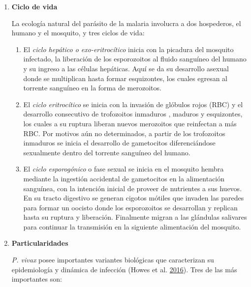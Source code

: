 \documentclass[
  a4paper]{article}
\providecommand{\tightlist}{%
  \setlength{\itemsep}{0pt}\setlength{\parskip}{0pt}}
\begin{document}
\begin{enumerate}
  \begin{enumerate}
  \def\labelenumii{\roman{enumii}.}
  \item
    \textbf{Ciclo de vida}

    La ecología natural del parásito de la malaria involucra a dos
    hospederos, el humano y el mosquito, y tres ciclos de vida:

    \begin{enumerate}
    \def\labelenumiii{\arabic{enumiii}.}
    \tightlist
    \item
      El \emph{ciclo hepático o exo-eritrocítico} inicia con la picadura
      del mosquito infectado, la liberación de los esporozoitos al
      fluido sanguíneo del humano y su ingreso a las células hepáticas.
      Aquí se da su desarrollo asexual donde se multiplican hasta formar
      esquizontes, los cuales egresan al torrente sanguíneo en la forma
      de merozoitos.
    \item
      El \emph{ciclo eritrocítico} se inicia con la invasión de glóbulos
      rojos (RBC) y el desarrollo consecutivo de trofozoitos inmaduros ,
      maduros y esquizontes, los cuales a su ruptura liberan nuevos
      merozoitos que reinfectan a más RBC. Por motivos aún no
      determinados, a partir de los trofozoitos inmaduros se inicia el
      desarrollo de gametocitos diferenciándose sexualmente dentro del
      torrente sanguíneo del humano.
    \item
      El \emph{ciclo esporogónico} o fase sexual se inicia en el
      mosquito hembra mediante la ingestión accidental de gametocitos en
      la alimentación sanguínea, con la intención inicial de proveer de
      nutrientes a sus huevos. En su tracto digestivo se generan cigotos
      mótiles que invaden las paredes para formar un oocisto donde los
      esporozoitos se desarrollan y replican hasta su ruptura y
      liberación. Finalmente migran a las glándulas salivares para
      continuar la transmisión en la siguiente alimentación del
      mosquito.
    \end{enumerate}
  \item
    \textbf{Particularidades}

    \emph{P. vivax} posee importantes variantes biológicas que
    caracterizan su epidemiología y dinámica de infección (Howes et al.
    \protect\hyperlink{ref-howes2016global}{2016}). Tres de las más
    importantes son:


\end{enumerate}
\end{enumerate}
\end{document}
